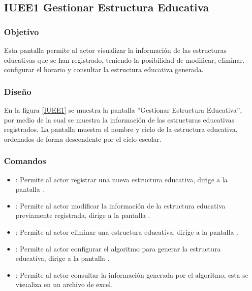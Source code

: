 \subsection{IUEE1 Gestionar Estructura Educativa}

\subsubsection{Objetivo}
	
	Esta pantalla permite al actor visualizar la información de las estructuras educativas que se han registrado, teniendo la posibilidad de modificar, eliminar, configurar el horario y consultar la estructura educativa generada.

\subsubsection{Diseño}

    En la figura \ref{IUEE1} se muestra la pantalla ''Gestionar Estructura Educativa'', por medio de la cual se muestra la información de las estructuras educativas registrados. La pantalla muestra el nombre y ciclo de la estructura educativa, ordenados de forma descendente por el ciclo escolar.
 

\subsubsection{Comandos}
    \begin{itemize}
		\item \btnRegistrar: Permite al actor registrar una nueva estructura educativa, dirige a la pantalla .
		
		\item {}: Permite al actor modificar la información de la estructura educativa previamente registrada, dirige a la pantalla .
		
		\item {}: Permite al actor eliminar una estructura educativa, dirige a la pantalla .
		
		\item {}: Permite al actor configurar el algoritmo para generar la estructura educativa, dirige a la pantalla .
	
		\item {}: Permite al actor consultar la información generada por el algoritmo, esta se visualiza en un archivo de excel.
    \end{itemize}
